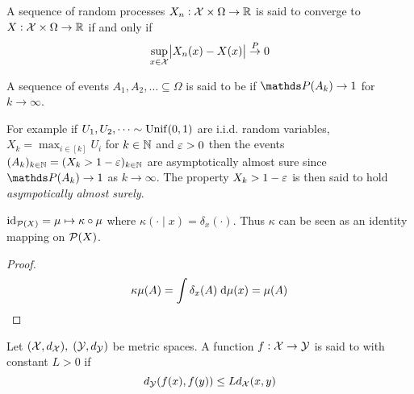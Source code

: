 \begin{defn} 
  A sequence of random processes $X_n: \mathcal{X} \times \Omega \to \mathbb{R}$
  is said to converge  to $X : \mathcal{X} \times \Omega \to \mathbb{R}$ if and only if
  \[ \sup_{x \in \mathcal{X}} \abs{X_n(x) - X(x)} \overset{P}{\to} 0 \]
  \label{defn:uniformConvProb}
\end{defn}

\begin{defn}
  A sequence of events $A_1, A_2, \dots \subseteq \Omega$
  is said to be 
  if $\Prob(A_k) \to 1$ for $k \to \infty$.
  \label{defn:aas}
\end{defn}

\begin{example}
  For example if $U_1, U_2, \dots \sim \mathrm{Unif}(0,1)$ are i.i.d. random
  variables, $X_k = \max_{i \in [k]} U_i$ for $k \in \mathbb{N}$ and $\varepsilon > 0$ then
  the events $(A_k)_{k \in \mathbb{N}} = (X_k > 1 - \varepsilon)_{k \in \mathbb{N}}$
  are asymptotically almost sure
  since $\Prob(A_k) \to 1$ as $k \to \infty$.
  The property
  $X_k > 1 - \varepsilon$ is then said to hold \emph{asympotically almost surely}.
  \label{example:aas}
\end{example}

\begin{prop}
  $\text{id}_{\mathcal{P}(X)} = \mu \mapsto \kappa \circ \mu$
  where $\kappa(\cdot \mid x) = \delta_x(\cdot)$.
  Thus $\kappa$ can be seen as an identity mapping on $\mathcal{P}(X)$.
  \label{prop:identityKernel}
\end{prop}
\begin{proof}
  \[ \kappa \mu (A) = \int \delta_x(A) \; \mathrm{d} \mu(x) = \mu (A) \]
\end{proof}

\begin{defn}
  Let $(\mathcal{X}, d_\mathcal{X}), \; (\mathcal{Y}, d_\mathcal{Y})$ be metric spaces.
  A function $f: \mathcal{X} \to \mathcal{Y}$ is
  said to  with constant $L > 0$ if
  \[ d_\mathcal{Y}(f(x),f(y)) \leq L d_\mathcal{X}(x,y) \]
  \label{defn:Lipschitz}
\end{defn}

